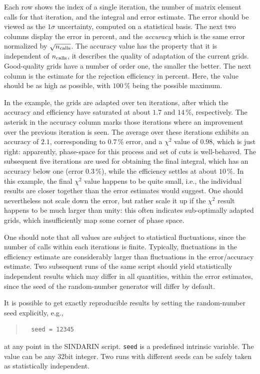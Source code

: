 \documentclass[12pt]{book}
\newcommand{\ttt}[1]{\texttt{#1}}
\begin{document}
Each row shows the index of a single iteration, the number of matrix element
calls for that iteration, and the integral and error estimate.  The error
should be viewed as the $1\sigma$ uncertainty, computed on a statistical
basis.  The next two columns display the error in percent, and the
\emph{accuracy} which is the same error normalized by $\sqrt{n_{\rm calls}}$.
The accuracy value has the property that it is independent of $n_{\rm calls}$,
it describes the quality of adaptation of the current grids.  Good-quality
grids have a number of order one, the smaller the better.  The next column is
the estimate for the rejection efficiency in percent.  Here, the value should
be as high as possible, with $100\,\%$ being the possible maximum.

In the example, the grids are adapted over ten iterations, after which the
accuracy and efficiency have saturated at about $1.7$ and $14\,\%$,
respectively.  The asterisk in the accuracy column marks those iterations
where an improvement over the previous iteration is seen.  The average over
these iterations exhibits an accuracy of $2.1$, corresponding to $0.7\,\%$
error, and a $\chi^2$ value of $0.98$, which is just right: apparently,
phase-space for this process and set of cuts is well-behaved.  The subsequent
five iterations are used for obtaining the final integral, which has an
accuracy below one (error $0.3\,\%$), while the efficiency settles at about
$10\,\%$.  In this example, the final $\chi^2$ value happens to be quite
small, i.e., the individual results are closer together than the error
estimates would suggest.  One should nevertheless not scale down the error,
but rather scale it up if the $\chi^2$ result happens to be much larger than
unity: this often indicates sub-optimally adapted grids, which insufficiently
map some corner of phase space.

One should note that all values are subject to statistical fluctuations, since
the number of calls within each iterations is finite.  Typically, fluctuations
in the efficiency estimate are considerably larger than fluctuations in the
error/accuracy estimate.  Two subsequent runs of the same script should yield
statistically independent results which may differ in all quantities, within
the error estimates, since the seed of the random-number generator will differ
by default.

It is possible to get exactly reproducible results by setting the
random-number seed explicitly, e.g.,
\begin{quote}
\begin{footnotesize}
\begin{verbatim}
  seed = 12345  
\end{verbatim}
\end{footnotesize}
\end{quote}
at any point in the SINDARIN script.  \ttt{seed} is a predefined intrinsic
variable.  The value can be any 32bit integer.  Two runs with different seeds
can be safely taken as statistically independent.
\end{document}
